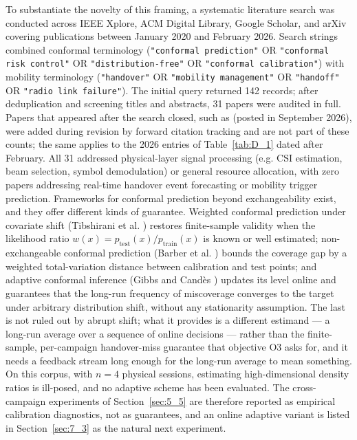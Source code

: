 To substantiate the novelty of this framing, a systematic literature search was conducted across IEEE Xplore, ACM Digital Library, Google Scholar, and arXiv covering publications between January 2020 and February 2026. Search strings combined conformal terminology (\texttt{"conformal prediction"} OR \texttt{"conformal risk control"} OR \texttt{"distribution-free"} OR \texttt{"conformal calibration"}) with mobility terminology (\texttt{"handover"} OR \texttt{"mobility management"} OR \texttt{"handoff"} OR \texttt{"radio link failure"}). The initial query returned 142 records; after deduplication and screening titles and abstracts, 31 papers were audited in full. Papers that appeared after the search closed, such as \cite{ref47} (posted in September 2026), were added during revision by forward citation tracking and are not part of these counts; the same applies to the 2026 entries of Table~\ref{tab:D_1} dated after February. All 31 addressed physical-layer signal processing (e.g. CSI estimation, beam selection, symbol demodulation) or general resource allocation, with zero papers addressing real-time handover event forecasting or mobility trigger prediction. Frameworks for conformal prediction beyond exchangeability exist, and they offer different kinds of guarantee. Weighted conformal prediction under covariate shift (Tibshirani et al. \cite{ref51}) restores finite-sample validity when the likelihood ratio $w(x) = p_{\text{test}}(x) / p_{\text{train}}(x)$ is known or well estimated; non-exchangeable conformal prediction (Barber et al. \cite{ref52}) bounds the coverage gap by a weighted total-variation distance between calibration and test points; and adaptive conformal inference (Gibbs and Cand\`es \cite{ref53}) updates its level online and guarantees that the long-run frequency of miscoverage converges to the target under arbitrary distribution shift, without any stationarity assumption. The last is not ruled out by abrupt shift; what it provides is a different estimand --- a long-run average over a sequence of online decisions --- rather than the finite-sample, per-campaign handover-miss guarantee that objective O3 asks for, and it needs a feedback stream long enough for the long-run average to mean something. On this corpus, with $n = 4$ physical sessions, estimating high-dimensional density ratios is ill-posed, and no adaptive scheme has been evaluated. The cross-campaign experiments of Section~\ref{sec:5_5} are therefore reported as empirical calibration diagnostics, not as guarantees, and an online adaptive variant is listed in Section~\ref{sec:7_3} as the natural next experiment.


